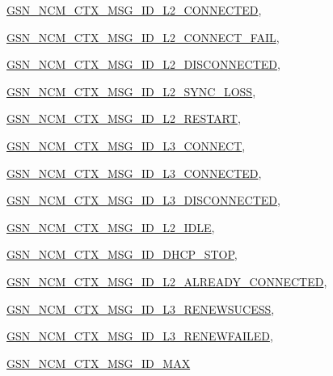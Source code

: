 \begin{DoxyCompactItemize}
\par
\hyperlink{a00688_gga7df8ae3172682e89bfa663208e3f0081ab7c2c3aa92aaa434c756acf574849d7e}{GSN\_\-NCM\_\-CTX\_\-MSG\_\-ID\_\-L2\_\-CONNECTED}, 
\par
\hyperlink{a00688_gga7df8ae3172682e89bfa663208e3f0081a3d625aa8bd3451c5d6756d7ca12a5a72}{GSN\_\-NCM\_\-CTX\_\-MSG\_\-ID\_\-L2\_\-CONNECT\_\-FAIL}, 
\par
\hyperlink{a00688_gga7df8ae3172682e89bfa663208e3f0081a6d6b2708ec053a54a35533ea89b82dbe}{GSN\_\-NCM\_\-CTX\_\-MSG\_\-ID\_\-L2\_\-DISCONNECTED}, 
\par
\hyperlink{a00688_gga7df8ae3172682e89bfa663208e3f0081a6d6969743dec280c81de97facc785085}{GSN\_\-NCM\_\-CTX\_\-MSG\_\-ID\_\-L2\_\-SYNC\_\-LOSS}, 
\par
\hyperlink{a00688_gga7df8ae3172682e89bfa663208e3f0081a5a1bac3915a3dc40cb070e75fdd809a0}{GSN\_\-NCM\_\-CTX\_\-MSG\_\-ID\_\-L2\_\-RESTART}, 
\par
\hyperlink{a00688_gga7df8ae3172682e89bfa663208e3f0081a6f85a2bfe3c47d23f9dd782d433383f4}{GSN\_\-NCM\_\-CTX\_\-MSG\_\-ID\_\-L3\_\-CONNECT}, 
\par
\hyperlink{a00688_gga7df8ae3172682e89bfa663208e3f0081a9645733074e6cf9524c08ecbafe78d78}{GSN\_\-NCM\_\-CTX\_\-MSG\_\-ID\_\-L3\_\-CONNECTED}, 
\par
\hyperlink{a00688_gga7df8ae3172682e89bfa663208e3f0081aab5e02a78811b59d9d996952c346681a}{GSN\_\-NCM\_\-CTX\_\-MSG\_\-ID\_\-L3\_\-DISCONNECTED}, 
\par
\hyperlink{a00688_gga7df8ae3172682e89bfa663208e3f0081a1a6bf8dbcf5fd9f73baedb3d92f37810}{GSN\_\-NCM\_\-CTX\_\-MSG\_\-ID\_\-L2\_\-IDLE}, 
\par
\hyperlink{a00688_gga7df8ae3172682e89bfa663208e3f0081ac37700bd992d190df8dfbe400d904996}{GSN\_\-NCM\_\-CTX\_\-MSG\_\-ID\_\-DHCP\_\-STOP}, 
\par
\hyperlink{a00688_gga7df8ae3172682e89bfa663208e3f0081a339e00a57d9d49209c486fa80fa3efb2}{GSN\_\-NCM\_\-CTX\_\-MSG\_\-ID\_\-L2\_\-ALREADY\_\-CONNECTED}, 
\par
\hyperlink{a00688_gga7df8ae3172682e89bfa663208e3f0081ae284cf6bfa63b7e17d6f074f24a8eed6}{GSN\_\-NCM\_\-CTX\_\-MSG\_\-ID\_\-L3\_\-RENEWSUCESS}, 
\par
\hyperlink{a00688_gga7df8ae3172682e89bfa663208e3f0081a997c45d4f40178db905d5099db419071}{GSN\_\-NCM\_\-CTX\_\-MSG\_\-ID\_\-L3\_\-RENEWFAILED}, 
\par
\hyperlink{a00688_gga7df8ae3172682e89bfa663208e3f0081a69add9c8fa35762c0fc5614ee77eaab3}{GSN\_\-NCM\_\-CTX\_\-MSG\_\-ID\_\-MAX}

\end{DoxyCompactItemize}
